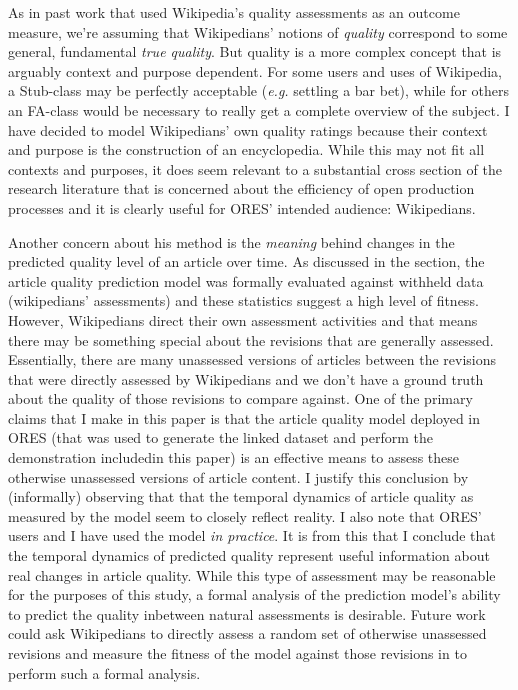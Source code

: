 As in past work that used Wikipedia's quality assessments as an outcome measure, we're assuming that Wikipedians' notions of \emph{quality} correspond to some general, fundamental \emph{true quality}.  But quality is a more complex concept that is arguably context and purpose dependent.  For some users and uses of Wikipedia, a Stub-class may be perfectly acceptable (\emph{e.g.} settling a bar bet), while for others an FA-class would be necessary to really get a complete overview of the subject.  I have decided to model Wikipedians' own quality ratings because their context and purpose is the construction of an encyclopedia.  While this may not fit all contexts and purposes, it does seem relevant to a substantial cross section of the research literature that is concerned about the efficiency of open production processes and it is clearly useful for ORES' intended audience: Wikipedians.

Another concern about his method is the \emph{meaning} behind changes in the predicted quality level of an article over time.  As discussed in the  section, the article quality prediction model was formally evaluated against withheld data (wikipedians' assessments) and these statistics suggest a high level of fitness.  However, Wikipedians direct their own assessment activities and that means there may be something special about the revisions that are generally assessed.  Essentially, there are many unassessed versions of articles between the revisions that were directly assessed by Wikipedians and we don't have a ground truth about the quality of those revisions to compare against.  One of the primary claims that I make in this paper is that the article quality model deployed in ORES (that was used to generate the linked dataset and perform the demonstration includedin this paper) is an effective means to assess these otherwise unassessed versions of article content.  I justify this conclusion by (informally) observing that that the temporal dynamics of article quality as measured by the model seem to closely reflect reality.  I also note that ORES' users and I have used the model \emph{in practice}.  It is from this that I conclude that the temporal dynamics of predicted quality represent useful information about real changes in article quality.  While this type of assessment may be reasonable for the purposes of this study, a formal analysis of the prediction model's ability to predict the quality inbetween natural assessments is desirable.  Future work could ask Wikipedians to directly assess a random set of otherwise unassessed revisions and measure the fitness of the model against those revisions in to perform such a formal analysis.

